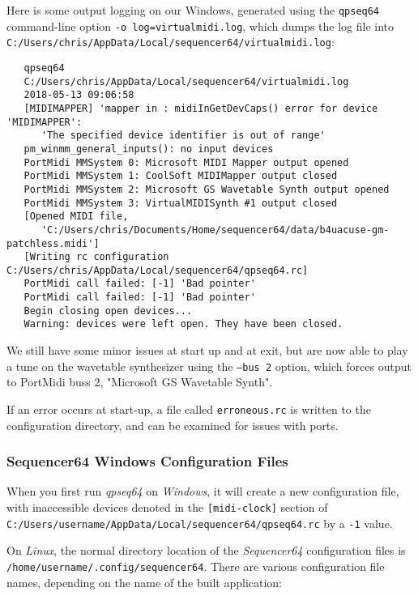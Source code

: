     Here is some output logging on our Windows, generated using the
    \texttt{qpseq64} command-line option
    \texttt{-o log=virtualmidi.log},
    which dumps the log file into
    \texttt{C:/Users/chris/AppData/Local/sequencer64/virtualmidi.log}:

\begin{verbatim}
   qpseq64 
   C:/Users/chris/AppData/Local/sequencer64/virtualmidi.log 
   2018-05-13 09:06:58 
   [MIDIMAPPER] 'mapper in : midiInGetDevCaps() error for device 'MIDIMAPPER':
      'The specified device identifier is out of range'
   pm_winmm_general_inputs(): no input devices
   PortMidi MMSystem 0: Microsoft MIDI Mapper output opened
   PortMidi MMSystem 1: CoolSoft MIDIMapper output closed
   PortMidi MMSystem 2: Microsoft GS Wavetable Synth output opened
   PortMidi MMSystem 3: VirtualMIDISynth #1 output closed
   [Opened MIDI file,
      'C:/Users/chris/Documents/Home/sequencer64/data/b4uacuse-gm-patchless.midi']
   [Writing rc configuration C:/Users/chris/AppData/Local/sequencer64/qpseq64.rc]
   PortMidi call failed: [-1] 'Bad pointer'
   PortMidi call failed: [-1] 'Bad pointer'
   Begin closing open devices...
   Warning: devices were left open. They have been closed.
\end{verbatim}

    We still have some minor issues at start up and at exit, but are now able
    to play a tune on the wavetable synthesizer using the
    \texttt{--bus 2} option, which forces output to PortMidi buss 2,
    "Microsoft GS Wavetable Synth".

    If an error occurs at start-up, a file called \texttt{erroneous.rc} is
    written to the configuration directory, and can be examined for issues with
    ports.

\subsubsection{Sequencer64 Windows Configuration Files}
\label{subsubsec:qt_portmidi_windows_setup_config}

    When you first run \textsl{qpseq64}
    on \textsl{Windows}, it will create a new configuration
    file, with inaccessible devices denoted in the
    \texttt{[midi-clock]} section of
    \texttt{C:/Users/username/AppData/Local/sequencer64/qpseq64.rc}
    by a \texttt{-1} value.

    On \textsl{Linux},
    the normal directory location of the \textsl{Sequencer64} configuration
    files is
    \texttt{/home/username/.config/sequencer64}.  There are various
    configuration file names, depending on the name of the built application:

